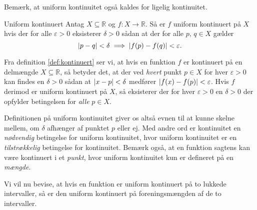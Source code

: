 Bemærk, at uniform kontinuitet også kaldes for ligelig kontinuitet.

\begin{definition}[label=def:uniform_kontinuert]{Uniform kontinuert}{}
  Antag $X \subseteq \mathbb{R}$ og $f:X \to \mathbb{R}$. 
  Så er $f$ uniform kontinuert på $X$ hvis der for alle $\varepsilon >0$ eksisterer $\delta >0$ sådan at der for alle $p,\,q \in X$ gælder
  \[
  \abs{p-q} < \delta \implies \abs{f(p)-f(q)}<\varepsilon .  
  \] 
\end{definition}

Fra definition \ref{def:kontinuert} ser vi, at hvis en funktion $f$ er kontinuert på en delmængde $X \subseteq \mathbb{R}$, så betyder det, at der ved \textit{hvert} punkt $p \in X$ for hver $\varepsilon >0$ kan findes en $\delta >0$ sådan at $\abs{x-p} <\delta $ medfører $\abs{f(x)-f(p)} < \varepsilon  $.
Hvis $f$ derimod er uniform kontinuert på $X$, så eksisterer der for hver $\varepsilon >0$ en $\delta >0$ der opfylder betingelsen for \textit{alle} $p \in X$. 

Definitionen på uniform kontinuitet giver os altså evnen til at kunne skelne mellem, om $\delta $ afhænger af punktet $p$ eller ej. 
Med andre ord er kontinuitet en \textit{nødvendig} betingelse for uniform kontinuitet, hvor uniform kontinuitet er en \textit{tilstrækkelig} betingelse for kontinuitet.
Bemærk også, at en funktion sagtens kan være kontinuert i et \textit{punkt}, hvor uniform kontinuitet kun er defineret på en \textit{mængde}.

Vi vil nu bevise, at hvis en funktion er uniform kontinuert på to lukkede intervaller, så er den uniform kontinuert på foreningsmængden af de to intervaller.

